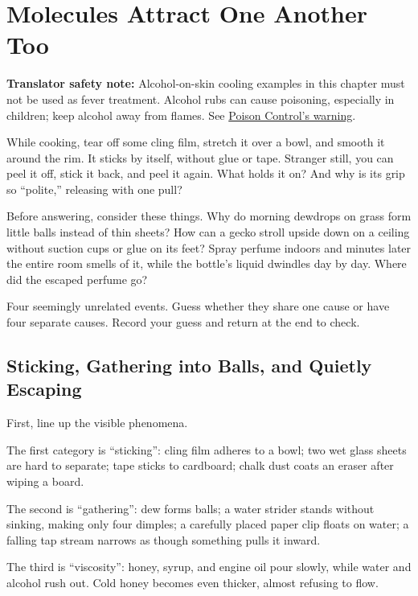 \chapter{Molecules Attract One Another Too}

\begin{kaichang}
\textbf{Translator safety note:} Alcohol-on-skin cooling examples in this chapter must not be used as fever treatment. Alcohol rubs can cause poisoning, especially in children; keep alcohol away from flames. See \href{https://www.poison.org/articles/rubbing-alcohol-only-looks-like-water}{Poison Control's warning}.

While cooking, tear off some cling film, stretch it over a bowl, and smooth it around the rim. It sticks by itself, without glue or tape. Stranger still, you can peel it off, stick it back, and peel it again. What holds it on? And why is its grip so ``polite,'' releasing with one pull?

Before answering, consider these things. Why do morning dewdrops on grass form little balls instead of thin sheets? How can a gecko stroll upside down on a ceiling without suction cups or glue on its feet? Spray perfume indoors and minutes later the entire room smells of it, while the bottle's liquid dwindles day by day. Where did the escaped perfume go?

Four seemingly unrelated events. Guess whether they share one cause or have four separate causes. Record your guess and return at the end to check.
\end{kaichang}

\section{Sticking, Gathering into Balls, and Quietly Escaping}

First, line up the visible phenomena.

The first category is ``sticking'': cling film adheres to a bowl; two wet glass sheets are hard to separate; tape sticks to cardboard; chalk dust coats an eraser after wiping a board.

The second is ``gathering'': dew forms balls; a water strider stands without sinking, making only four dimples; a carefully placed paper clip floats on water; a falling tap stream narrows as though something pulls it inward.

The third is ``viscosity'': honey, syrup, and engine oil pour slowly, while water and alcohol rush out. Cold honey becomes even thicker, almost refusing to flow.

